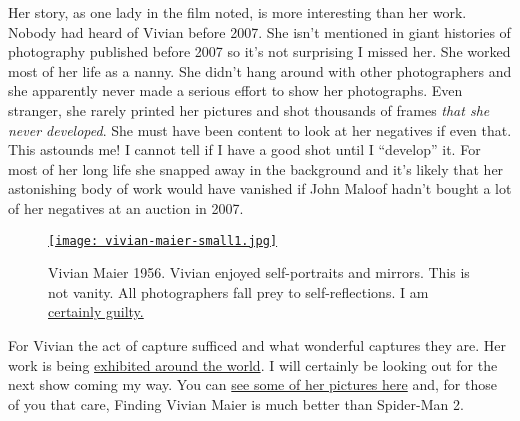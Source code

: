 Her story, as one lady in the film noted, is more interesting than her
work. Nobody had heard of Vivian before 2007. She isn't mentioned in
giant histories of photography published before 2007 so it's not
surprising I missed her. She worked most of her life as a nanny. She
didn't hang around with other photographers and she apparently never
made a serious effort to show her photographs. Even stranger, she rarely
printed her pictures and shot thousands of frames \emph{that she never
developed}. She must have been content to look at her negatives if even
that. This astounds me! I cannot tell if I have a good shot until I
``develop'' it. For most of her long life she snapped away in the
background and it's likely that her astonishing body of work would have
vanished if John Maloof hadn't bought a lot of her negatives at an
auction in 2007.

\captionsetup[figure]{labelformat=empty}
\begin{SCfigure}[30] %
\centering
\href{http://www.vivianmaier.com/gallery/self-portraits/\#slide-33}{\texttt{[image: vivian-maier-small1.jpg]}}
\caption[Vivian Maier 1956. Vivian enjoyed self-portraits and mirrors.]{Vivian Maier 1956. Vivian enjoyed self-portraits and mirrors. This is
not vanity. All photographers fall prey to self-reflections. I am
\href{http://conceptcontrol.smugmug.com/People/The-Way-We-Were/i-B3qJtKz/A}{certainly
guilty.}}
\label{fig:4711X0}
\end{SCfigure}

For Vivian the act of capture sufficed and what wonderful captures they
are. Her work is being
\href{http://www.vivianmaier.com/exhibitions-events/}{exhibited around
the world}. I will certainly be looking out for the next show coming my
way. You can \href{http://www.vivianmaier.com/}{see some of her pictures
here} and, for those of you that care, Finding Vivian Maier is much
better than Spider-Man 2.




%